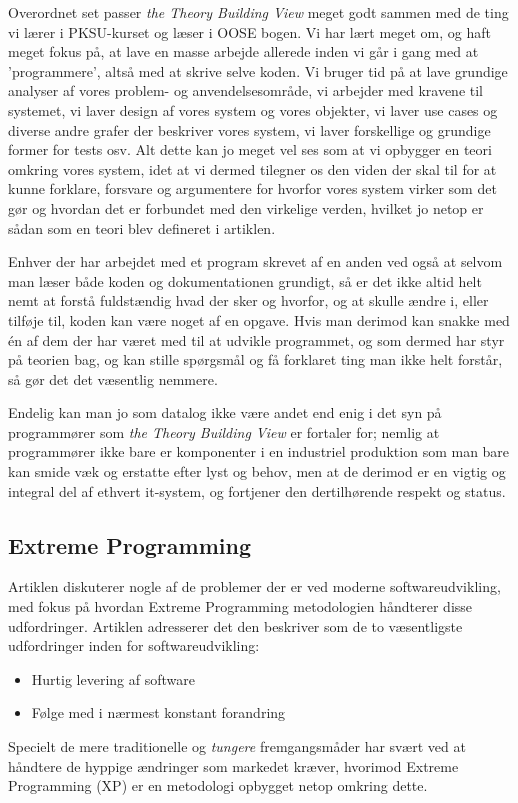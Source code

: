 \documentclass[11pt, a4paper]{article}
\begin{document}
Overordnet set passer \emph{the Theory Building View} meget godt sammen med de ting vi lærer i PKSU-kurset og læser i OOSE\cite{OOSE} bogen. Vi har lært meget om, og haft meget fokus på, at lave en masse arbejde allerede inden vi går i gang med at 'programmere', altså med at skrive selve koden. Vi bruger tid på at lave grundige analyser af vores problem- og anvendelsesområde, vi arbejder med kravene til systemet, vi laver design af vores system og vores objekter, vi laver use cases og diverse andre grafer der beskriver vores system, vi laver forskellige og grundige former for tests osv. Alt dette kan jo meget vel ses som at vi opbygger en teori omkring vores system, idet at vi dermed tilegner os den viden der skal til for at kunne forklare, forsvare og argumentere for hvorfor vores system virker som det gør og hvordan det er forbundet med den virkelige verden, hvilket jo netop er sådan som en teori blev defineret i artiklen.

Enhver der har arbejdet med et program skrevet af en anden ved også at selvom man læser både koden og dokumentationen grundigt, så er det ikke altid helt nemt at forstå fuldstændig hvad der sker og hvorfor, og at skulle ændre i, eller tilføje til, koden kan være noget af en opgave. Hvis man derimod kan snakke med én af dem der har været med til at udvikle programmet, og som dermed har styr på teorien bag, og kan stille spørgsmål og få forklaret ting man ikke helt forstår, så gør det det væsentlig nemmere.

Endelig kan man jo som datalog ikke være andet end enig i det syn på programmører som \emph{the Theory Building View} er fortaler for; nemlig at programmører ikke bare er komponenter i en industriel produktion som man bare kan smide væk og erstatte efter lyst og behov, men at de derimod er en vigtig og integral del af ethvert it-system, og fortjener den dertilhørende respekt og status.

\subsection{Extreme Programming}
\label{sub:extreme_programming}
Artiklen diskuterer nogle af de problemer der er ved moderne softwareudvikling, med fokus på hvordan Extreme Programming metodologien håndterer disse udfordringer. Artiklen adresserer det den beskriver som de to væsentligste udfordringer inden for softwareudvikling:
\begin{itemize}
\item Hurtig levering af software
\item Følge med i nærmest konstant forandring
\end{itemize}
Specielt de mere traditionelle og \emph{tungere} fremgangsmåder har svært ved at håndtere de hyppige ændringer som markedet kræver, hvorimod Extreme Programming (XP) er en metodologi opbygget netop omkring dette.
\end{document}
